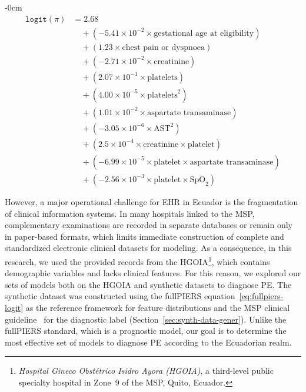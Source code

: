 \documentclass[diagnostics,article,submit,pdftex,moreauthors]{Definitions/mdpi}
\begin{document}
\begin{linenomath}
\begin{adjustwidth}{-\extralength}{0cm}
\begin{equation}
  \begin{aligned}
    \texttt{logit}(\pi) &= 2.68 \\
              &\quad + (-5.41 \times 10^{-2} \times \text{gestational age at eligibility}) \\
              &\quad + (1.23 \times \text{chest pain or dyspnoea}) \\
              &\quad + (-2.71 \times 10^{-2} \times \text{creatinine}) \\
              &\quad + (2.07 \times 10^{-1} \times \text{platelets}) \\
              &\quad + (4.00 \times 10^{-5} \times \text{platelets}^2) \\
              &\quad + (1.01 \times 10^{-2} \times \text{aspartate transaminase}) \\
              &\quad + (-3.05 \times 10^{-6} \times \text{AST}^2) \\
              &\quad + (2.5 \times 10^{-4} \times \text{creatinine} \times \text{platelet}) \\
              &\quad + (-6.99 \times 10^{-5} \times \text{platelet} \times \text{aspartate transaminase}) \\
              &\quad + (-2.56 \times 10^{-3} \times \text{platelet} \times \text{SpO}_2)
  \end{aligned}
    \label{eq:fullpiers-logit}
\end{equation}
\end{adjustwidth}
\end{linenomath}

However, a major operational challenge for \ac{EHR} in Ecuador
is the fragmentation of clinical information systems. In many
hospitals linked to the \ac{MSP}, complementary examinations are
recorded in separate databases or remain only in paper-based formats,
which limits immediate construction of complete and standardized
electronic clinical datasets for modeling. As a consequence, in this
research, we used the provided records from the
\ac{HGOIA}\footnote{\textit{Hospital Gineco Obstétrico Isidro Ayora (HGOIA)}, a
  third-level public specialty hospital in Zone~9 of the \ac{MSP},
  Quito, Ecuador.}, which contains demographic variables and lacks
clinical features. For this reason, we explored our sets of models
both on the \ac{HGOIA} and synthetic datasets to diagnose
\ac{PE}. The synthetic dataset was constructed using the
full\ac{PIERS} equation~\eqref{eq:fullpiers-logit} as the
reference framework for feature distributions and the
\ac{MSP} clinical guideline~\cite{msp_ecuador_hdp_2013} for
the diagnostic label (Section~\ref{sec:synth-data-gener}). Unlike the full\ac{PIERS} standard, which is a
prognostic model, our goal is to determine the most effective set of
models to diagnose \ac{PE} according to the Ecuadorian realm.
\end{document}
